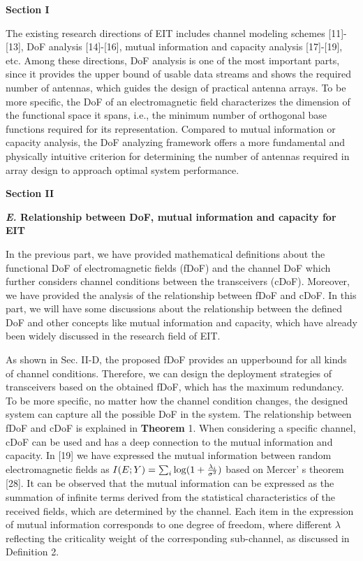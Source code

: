 \documentclass[a4paper,12pt]{article}
\begin{document}
\begin{framed}
    {\bf Section I}

	\setcounter{equation}{0}
	
\quad The existing research directions of EIT includes channel modeling schemes [11]-[13], DoF analysis [14]-[16], mutual information and capacity analysis [17]-[19], etc.
Among these directions, DoF analysis is one of the most important parts, since it provides the upper bound of usable data streams and shows the required number of antennas, which guides the design of practical antenna arrays. {\color{red}To be more specific, the DoF of an electromagnetic field characterizes the dimension of the functional space it spans, i.e., the minimum number of orthogonal base functions required for its representation. Compared to mutual information or capacity analysis, the DoF analyzing framework offers a more fundamental and physically intuitive criterion for determining the number of antennas required in array design to approach optimal system performance. }

{\bf Section II}

	{\bf \color{red} {\it \bf E.} Relationship between DoF, mutual information and capacity for EIT}
	
	{\color{red}
	
	\quad In the previous part, we have provided mathematical definitions about the functional DoF of electromagnetic fields (fDoF) and the channel DoF which further considers channel conditions between the transceivers (cDoF). Moreover, we have provided the analysis of the relationship between fDoF and cDoF. In this part, we will have some discussions about the relationship between the defined DoF and other concepts like mutual information and capacity, which have already been widely discussed in the research field of EIT.
	
	\quad As shown in Sec. II-D, the proposed fDoF provides an upperbound for all kinds of channel conditions. Therefore, we can design the deployment strategies of transceivers based on the obtained fDoF, which has the maximum redundancy. To be more specific, no matter how the channel condition changes, the designed system can capture all the possible DoF in the system. The relationship between fDoF and cDoF is explained in {\bf Theorem} 1. When considering a specific channel, cDoF can be used and has a deep connection to the mutual information and capacity. In [19] we have expressed the mutual information between random electromagnetic fields as $I(E;Y) = \sum_i{\rm log}(1+\frac{\lambda_i}{\sigma^2})$ based on Mercer' s theorem [28]. It can be observed that the mutual information can be expressed as the summation of infinite terms derived from the statistical characteristics of the received fields, which are determined by the channel. Each item in the expression of mutual information corresponds to one degree of freedom, where different $\lambda$ reflecting the criticality weight of the corresponding sub-channel, as discussed in Definition 2.
	
}
\end{framed}
\end{document}
